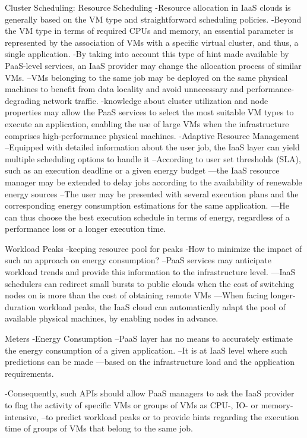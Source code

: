 Cluster Scheduling: Resource Scheduling
-Resource allocation in IaaS clouds is generally based on the VM type and straightforward scheduling policies. 
-Beyond the VM type in terms of required CPUs and memory, an essential parameter is represented by the association of VMs with a specific virtual cluster, and thus, a single application.
-By taking into account this type of hint made available by PaaS-level services, an IaaS provider may change the allocation process of similar VMs. 
--VMs belonging to the same job may be deployed on the same physical machines to benefit from data locality and avoid unnecessary and performance-degrading network traffic.
-knowledge about cluster utilization and node properties may allow the PaaS services to select the most suitable VM types to execute an application, enabling the use of large VMs when the infrastructure comprises high-performance physical machines.
-Adaptive Resource Management
--Equipped with detailed information about the user job, the IaaS layer can yield multiple scheduling options to handle it
--According to user set thresholds (SLA), such as an execution deadline or a given energy budget
---the IaaS resource manager may be extended to delay jobs according to the availability of renewable energy sources
--The user may be presented with several execution plans and the corresponding energy consumption estimations for the same application. 
---He can thus choose the best execution schedule in terms of energy, regardless of a performance loss or a longer execution time.

Workload Peaks
-keeping resource pool for peaks
-How to minimize the impact of such an approach on energy consumption?
--PaaS services may anticipate workload trends and provide this information to the infrastructure level. 
---IaaS schedulers can redirect small bursts to public clouds when the cost of switching nodes on is more than the cost of obtaining remote VMs
---When facing longer-duration workload peaks, the IaaS cloud can automatically adapt the pool of available physical machines, by enabling nodes in advance.

Meters
-Energy Consumption
--PaaS layer has no means to accurately estimate the energy consumption of a given application.
--It is at IaaS level where such predictions can be made
---based on the infrastructure load and the application requirements.

-Consequently, such APIs should allow PaaS managers to ask the IaaS provider to flag the activity of specific VMs or groups of VMs as CPU-, IO- or memory-intensive, 
--to predict workload peaks or to provide hints regarding the execution time of groups of VMs that belong to the same job.


